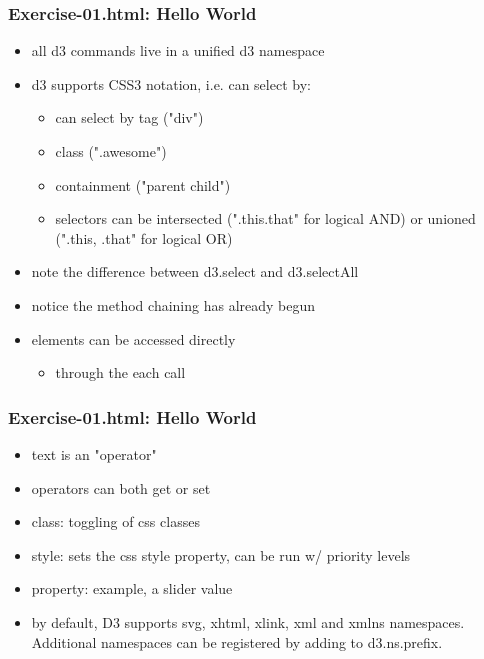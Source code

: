 \documentclass{beamer}
\begin{document}
\begin{frame}
    \frametitle{Exercise-01.html: Hello World}
    \begin{itemize}
    \item all d3 commands live in a unified d3 namespace
    \item d3 supports CSS3 notation, i.e. can select by:
        \begin{itemize}
        \item can select by tag ("div")
        \item class (".awesome")
        \item containment ("parent child")
        \item selectors can be intersected (".this.that" for logical AND) or unioned (".this, .that" for logical OR)
        \end{itemize}
    \item note the difference between d3.select and d3.selectAll
    \item notice the method chaining has already begun
    \item elements can be accessed directly
        \begin{itemize}
        \item through the each call
        \end{itemize}
    \end{itemize}
\end{frame}



\begin{frame}
    \frametitle{Exercise-01.html: Hello World}
    \begin{itemize}
    \item text is an "operator"
    \item operators can both get or set 
    \item class: toggling of css classes
    \item style: sets the css style property, can be run w/ priority levels
    \item property: example, a slider value
    \item by default, D3 supports svg, xhtml, xlink, xml and xmlns namespaces. Additional namespaces can be registered by adding to d3.ns.prefix.
    \end{itemize}
\end{frame}
\end{document}
